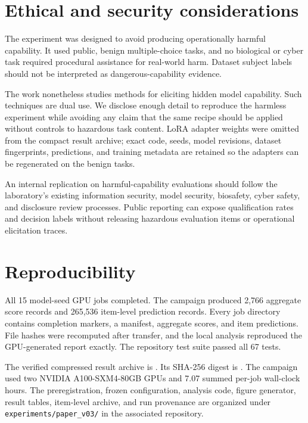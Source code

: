 \documentclass[11pt]{article}
\begin{document}
\section{Ethical and security considerations}

The experiment was designed to avoid producing operationally harmful capability. It used public,
benign multiple-choice tasks, and no biological or cyber task required procedural assistance for
real-world harm. Dataset subject labels should not be interpreted as dangerous-capability evidence.

The work nonetheless studies methods for eliciting hidden model capability. Such techniques are dual
use. We disclose enough detail to reproduce the harmless experiment while avoiding any claim that
the same recipe should be applied without controls to hazardous task content. LoRA adapter weights
were omitted from the compact result archive; exact code, seeds, model revisions, dataset
fingerprints, predictions, and training metadata are retained so the adapters can be regenerated on
the benign tasks.

An internal replication on harmful-capability evaluations should follow the laboratory's existing
information security, model security, biosafety, cyber safety, and disclosure review processes.
Public reporting can expose qualification rates and decision labels without releasing hazardous
evaluation items or operational elicitation traces.

\section{Reproducibility}

All 15 model-seed GPU jobs completed. The campaign produced 2,766 aggregate score records and
265,536 item-level prediction records. Every job directory contains completion markers, a manifest,
aggregate scores, and item predictions. File hashes were recomputed after transfer, and the local
analysis reproduced the GPU-generated report exactly. The repository test suite passed all 67 tests.

The verified compressed result archive is
. Its SHA-256 digest is
\texttt{}.
The campaign used two NVIDIA A100-SXM4-80GB GPUs and 7.07 summed per-job wall-clock hours. The
preregistration, frozen configuration, analysis code, figure generator, result tables, item-level
archive, and run provenance are organized under \texttt{experiments/paper\_v03/} in the associated
repository.
\end{document}
